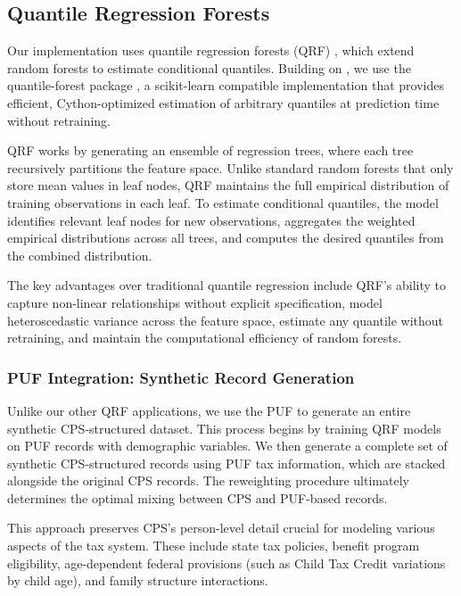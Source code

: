 \subsection{Quantile Regression Forests}

Our implementation uses quantile regression forests (QRF) \citep{meinshausen2006quantile}, which extend random forests to estimate conditional quantiles. Building on \citet{woodruff2023survey}, we use the quantile-forest package \citep{zillow2024quantile}, a scikit-learn compatible implementation that provides efficient, Cython-optimized estimation of arbitrary quantiles at prediction time without retraining.

QRF works by generating an ensemble of regression trees, where each tree recursively partitions the feature space. Unlike standard random forests that only store mean values in leaf nodes, QRF maintains the full empirical distribution of training observations in each leaf. To estimate conditional quantiles, the model identifies relevant leaf nodes for new observations, aggregates the weighted empirical distributions across all trees, and computes the desired quantiles from the combined distribution.

The key advantages over traditional quantile regression include QRF's ability to capture non-linear relationships without explicit specification, model heteroscedastic variance across the feature space, estimate any quantile without retraining, and maintain the computational efficiency of random forests.

\subsubsection{PUF Integration: Synthetic Record Generation}

Unlike our other QRF applications, we use the PUF to generate an entire synthetic CPS-structured dataset. This process begins by training QRF models on PUF records with demographic variables. We then generate a complete set of synthetic CPS-structured records using PUF tax information, which are stacked alongside the original CPS records. The reweighting procedure ultimately determines the optimal mixing between CPS and PUF-based records.

This approach preserves CPS's person-level detail crucial for modeling various aspects of the tax system. These include state tax policies, benefit program eligibility, age-dependent federal provisions (such as Child Tax Credit variations by child age), and family structure interactions.

